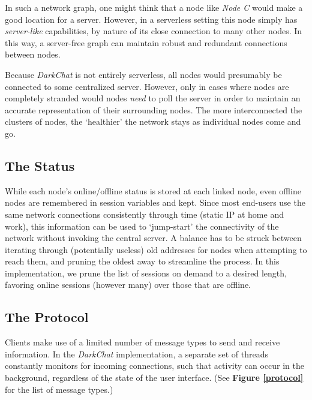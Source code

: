 \documentclass[11pt]{article}
\begin{document}
In such a network graph, one might think that a node like \emph{Node C} would make a good location for a server. However, in a serverless setting this node simply has \emph{server-like} capabilities, by nature of its close connection to many other nodes. In this way, a server-free graph can maintain robust and redundant connections between nodes.

Because \emph{DarkChat} is not entirely serverless, all nodes would presumably be connected to some centralized server. However, only in cases where nodes are completely stranded would nodes \emph{need} to poll the server in order to maintain an accurate representation of their surrounding nodes. The more interconnected the clusters of nodes, the `healthier' the network stays as individual nodes come and go.

\subsection{The Status}

While each node's online/offline status is stored at each linked node, even offline nodes are remembered in session variables and kept. Since most end-users use the same network connections consistently through time (static IP at home and work), this information can be used to `jump-start' the connectivity of the network without invoking the central server. A balance has to be struck between iterating through (potentially useless) old addresses for nodes when attempting to reach them, and pruning the oldest away to streamline the process. In this implementation, we prune the list of sessions on demand to a desired length, favoring online sessions (however many) over those that are offline.
   
\subsection{The Protocol}

Clients make use of a limited number of message types to send and receive information. In the \emph{DarkChat} implementation, a separate set of threads constantly monitors for incoming connections, such that activity can occur in the background, regardless of the state of the user interface. (See {\bf Figure \ref{protocol}} for the list of message types.)
\end{document}
